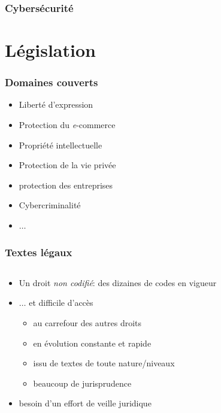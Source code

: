 \begin{reveals}
\begin{frame}
  \frametitle{Cybersécurité}


\end{frame}

\section{Législation}

\begin{frame}
  \frametitle{Domaines couverts}

  \begin{itemize}
  \item Liberté d'expression
  \item Protection du \textit{e}-commerce
  \item Propriété intellectuelle
  \item Protection de la vie privée
  \item protection des entreprises
  \item Cybercriminalité
  \item \(\ldots\)
  \end{itemize}
\end{frame}

\begin{frame}
  \frametitle{Textes légaux}

  \begin{columns}
    \begin{column}{0.6\textwidth}
      \begin{itemize}
      \item Un droit \emph{non codifié}: des dizaines de codes en vigueur
      \item \(\ldots\) et difficile d'accès
        \begin{itemize}
        \item au carrefour des autres droits
        \item en évolution constante et rapide
        \item issu de textes de toute nature/niveaux
        \item beaucoup de jurisprudence
        \end{itemize}
      \item besoin d'un effort de veille juridique 
      \end{itemize}      
    \end{column}
    \begin{column}{0.27\textwidth}
      \codelegal{\parbox{\textwidth}{\(\ldots\)}}
    \end{column}
  \end{columns}


\end{frame}
\end{reveals}
